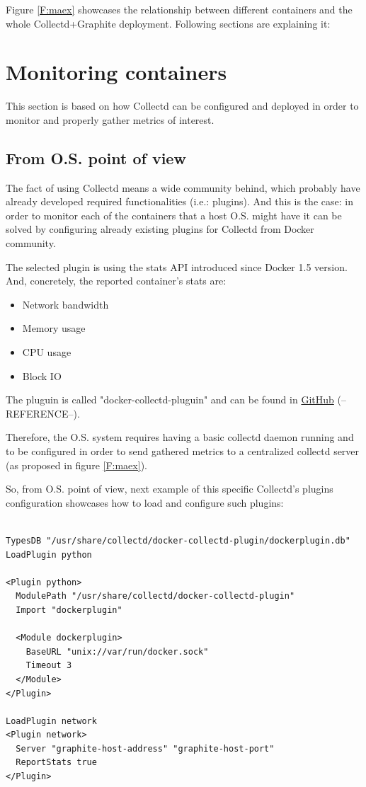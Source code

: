 Figure \ref{F:maex} showcases the relationship between different containers and the whole Collectd+Graphite deployment. Following sections are explaining it:

\section{Monitoring containers}

This section is based on how Collectd can be configured and deployed in order to monitor and properly gather metrics of interest.

\subsection{From O.S. point of view}

The fact of using Collectd means a wide community behind, which probably have already developed required functionalities (i.e.: plugins). And this is the case: in order to monitor each of the containers that a host O.S. might have it can be solved by configuring already existing plugins for Collectd from Docker community. 

The selected plugin is using the stats API introduced since Docker 1.5 version. And, concretely, the reported container's stats are:
 
\begin{itemize}
\item Network bandwidth
\item Memory usage
\item CPU usage
\item Block IO
\end{itemize}

The pluguin is called "docker-collectd-pluguin" and can be found in \href{https://github.com/lebauce/docker-collectd-plugin}{GitHub} (--REFERENCE--).

Therefore, the O.S. system requires having a basic collectd daemon running and to be configured in order to send gathered metrics to a centralized collectd server (as proposed in figure \ref{F:maex}).

So, from O.S. point of view, next example of this specific Collectd's plugins configuration showcases how to load and configure such plugins:

\begin{verbatim}

TypesDB "/usr/share/collectd/docker-collectd-plugin/dockerplugin.db"
LoadPlugin python

<Plugin python>
  ModulePath "/usr/share/collectd/docker-collectd-plugin"
  Import "dockerplugin"

  <Module dockerplugin>
    BaseURL "unix://var/run/docker.sock"
    Timeout 3
  </Module>
</Plugin>

LoadPlugin network
<Plugin network>
  Server "graphite-host-address" "graphite-host-port"
  ReportStats true
</Plugin>

\end{verbatim}

